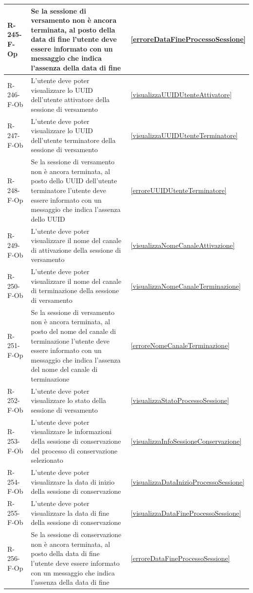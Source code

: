 \begin{longtable}{|p{2.5cm}|p{9.5cm}|p{2.5cm}|}
\hline
R-245-F-Op & Se la sessione di versamento non è ancora terminata, al posto della data di fine l'utente deve essere informato con un messaggio che indica l'assenza della data di fine & \ref{erroreDataFineProcessoSessione} \\
\hline
R-246-F-Ob & L'utente deve poter visualizzare lo UUID dell'utente attivatore della sessione di versamento & \ref{visualizzaUUIDUtenteAttivatore} \\
\hline
R-247-F-Ob & L'utente deve poter visualizzare lo UUID dell'utente terminatore della sessione di versamento & \ref{visualizzaUUIDUtenteTerminatore} \\
\hline
R-248-F-Op & Se la sessione di versamento non è ancora terminata, al posto dello UUID dell'utente terminatore l'utente deve essere informato con un messaggio che indica l'assenza dello UUID & \ref{erroreUUIDUtenteTerminatore} \\
\hline
R-249-F-Ob & L'utente deve poter visualizzare il nome del canale di attivazione della sessione di versamento & \ref{visualizzaNomeCanaleAttivazione} \\
\hline
R-250-F-Ob & L'utente deve poter visualizzare il nome del canale di terminazione della sessione di versamento & \ref{visualizzaNomeCanaleTerminazione} \\
\hline
R-251-F-Op & Se la sessione di versamento non è ancora terminata, al posto del nome del canale di terminazione l'utente deve essere informato con un messaggio che indica l'assenza del nome del canale di terminazione & \ref{erroreNomeCanaleTerminazione} \\
\hline
R-252-F-Ob & L'utente deve poter visualizzare lo stato della sessione di versamento & \ref{visualizzaStatoProcessoSessione} \\
\hline
R-253-F-Ob & L'utente deve poter visualizzare le informazioni della sessione di conservazione del processo di conservazione selezionato & \ref{visualizzaInfoSessioneConservazione} \\
\hline
R-254-F-Ob & L'utente deve poter visualizzare la data di inizio della sessione di conservazione & \ref{visualizzaDataInizioProcessoSessione} \\
\hline
R-255-F-Ob & L'utente deve poter visualizzare la data di fine della sessione di conservazione & \ref{visualizzaDataFineProcessoSessione} \\
\hline
R-256-F-Op & Se la sessione di conservazione non è ancora terminata, al posto della data di fine l'utente deve essere informato con un messaggio che indica l'assenza della data di fine & \ref{erroreDataFineProcessoSessione} \\

\end{longtable}
